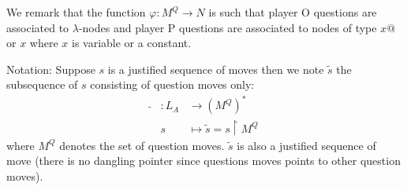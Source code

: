 We remark that the function $\varphi : M^Q \rightarrow N$ is such that player O questions are associated to $\lambda$-nodes
and player P questions are associated to nodes of type $x @$ or $x$ where $x$ is variable or a constant.


Notation: Suppose $s$ is a justified sequence of moves then we note $\tilde{s}$
the subsequence of $s$ consisting of question moves only:
\begin{eqnarray*}
\tilde{} &: L_A &\longrightarrow (M^Q)^* \\
& s &\longmapsto \tilde{s} = s \upharpoonright M^Q
\end{eqnarray*}
where $M^Q$ denotes the set of question moves.
$\tilde{s}$ is also a justified sequence of move (there is no dangling pointer since questions moves points to other question moves).


